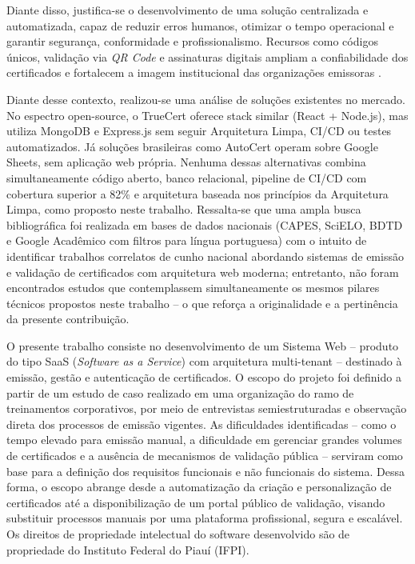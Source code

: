 \documentclass[12pt,openright,oneside,a4paper]{article}
\newcounter{rn}
\begin{document}
Diante disso, justifica-se o desenvolvimento de uma solução centralizada e automatizada, capaz de reduzir erros humanos, otimizar o tempo operacional e garantir segurança, conformidade e profissionalismo. Recursos como códigos únicos, validação via \textit{QR Code} e assinaturas digitais ampliam a confiabilidade dos certificados e fortalecem a imagem institucional das organizações emissoras \cite{kulkarni2025}.

Diante desse contexto, realizou-se uma análise de soluções existentes no mercado. No espectro open-source, o TrueCert \cite{truecert2025} oferece stack similar (React + Node.js), mas utiliza MongoDB e Express.js sem seguir Arquitetura Limpa, CI/CD ou testes automatizados. Já soluções brasileiras como AutoCert \cite{autocert2025} operam sobre Google Sheets, sem aplicação web própria. Nenhuma dessas alternativas combina simultaneamente código aberto, banco relacional, pipeline de CI/CD com cobertura superior a 82\% e arquitetura baseada nos princípios da Arquitetura Limpa, como proposto neste trabalho. Ressalta-se que uma ampla busca bibliográfica foi realizada em bases de dados nacionais (CAPES, SciELO, BDTD e Google Acadêmico com filtros para língua portuguesa) com o intuito de identificar trabalhos correlatos de cunho nacional abordando sistemas de emissão e validação de certificados com arquitetura web moderna; entretanto, não foram encontrados estudos que contemplassem simultaneamente os mesmos pilares técnicos propostos neste trabalho -- o que reforça a originalidade e a pertinência da presente contribuição.

O presente trabalho consiste no desenvolvimento de um Sistema Web -- produto do tipo SaaS (\textit{Software as a Service}) com arquitetura multi-tenant -- destinado à emissão, gestão e autenticação de certificados. O escopo do projeto foi definido a partir de um estudo de caso realizado em uma organização do ramo de treinamentos corporativos, por meio de entrevistas semiestruturadas e observação direta dos processos de emissão vigentes. As dificuldades identificadas -- como o tempo elevado para emissão manual, a dificuldade em gerenciar grandes volumes de certificados e a ausência de mecanismos de validação pública -- serviram como base para a definição dos requisitos funcionais e não funcionais do sistema. Dessa forma, o escopo abrange desde a automatização da criação e personalização de certificados até a disponibilização de um portal público de validação, visando substituir processos manuais por uma plataforma profissional, segura e escalável. Os direitos de propriedade intelectual do software desenvolvido são de propriedade do Instituto Federal do Piauí (IFPI).
\end{document}
